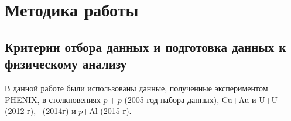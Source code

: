 \chapter{Методика работы} \label{chapt3}

\section{Критерии отбора данных и подготовка данных к физическому анализу} \label{sect3_cuts}
В данной работе были использованы данные, полученные экспериментом PHENIX, в столкновениях $p+p$ (2005 год набора данных), Cu+Au и U+U (2012 г), \heau \ (2014г) и $p$+Al (2015 г).


\begin{table}
	\caption{Критерии отбора данных}
\end{table}
